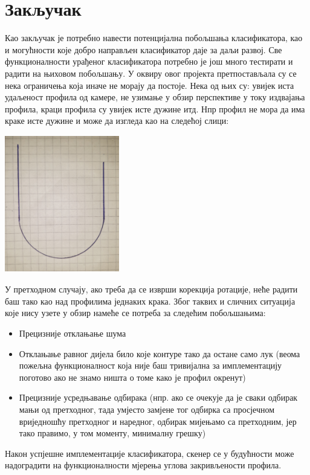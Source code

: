 \documentclass[12pt]{article}
\begin{document}
\section{Закључак}
Као закључак је потребно навести потенцијална побољшања класификатора, као и могућности које добро направљен класификатор даје за даљи развој. Све функционалности урађеног класификатора потребно је још много тестирати и радити на њиховом побољшању. У оквиру овог пројекта претпостављала су се нека ограничења која иначе не морају да постоје. Нека од њих су: увијек иста удаљеност профила од камере, не узимање у обзир перспективе у току издвајања профила, краци профила су увијек исте дужине итд. Нпр профил не мора да има краке исте дужине и може да изгледа као на следећој слици:
\vspace{0.5cm}
\begin{center}
    \centering 
    \includegraphics[height=6cm, width=5cm]{images/zakljucak1.jpg}
\end{center}
\vspace{0.5cm}
У претходном случају, ако треба да се изврши корекција ротације, неће радити баш тако као над профилима једнаких крака. Због таквих и сличних ситуација које нису узете у обзир намеће се потреба за следећим побољшањима:
\begin{itemize}
    \item Прецизније отклањање шума
    \item Отклањање равног дијела било које контуре тако да остане само лук (веома пожељна функционалност која није баш тривијална за имплементацију поготово ако не знамо ништа о томе како је профил окренут)
    \item Прецизније усредњавање одбирака (нпр. ако се очекује да је сваки одбирак мањи од претходног, тада умјесто замјене тог одбирка са просјечном вриједношћу претходног и наредног, одбирак мијењамо са претходним, јер тако правимо, у том моменту, минималну грешку)
\end{itemize}
Након успјешне имплементације класификатора, скенер се у будућности може надоградити на функционалности мјерења углова закривљености профила.
\end{document}
